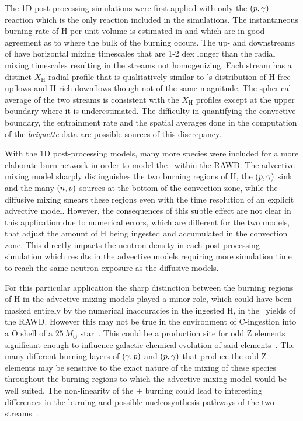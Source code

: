 \documentclass[fleqn,usenatbib]{mnras}
\newcommand{\ppmstar}{\code{PPMstar}}
\begin{document}
The 1D \mppnp{} post-processing simulations were first applied with only the
$(p,\gamma)$ reaction which is the only reaction
included in the \ppmstar{} simulations. The instantaneous burning rate of H per
unit volume is estimated in  and  which are in good
agreement as to where the bulk of the burning occurs.
The up- and downstreams of  have horizontal mixing timescales that
are 1-2 dex longer than the radial mixing timescales resulting in the streams
not homogenizing. Each stream has a distinct $X_{\mathrm{H}}$ radial profile
that is qualitatively similar to 's distribution of H-free upflows and
H-rich downflows though not of the same magnitude. The spherical average of the
two streams is consistent with the \ppmstar{} $X_{\mathrm{H}}$ profiles except
at the upper boundary where it is underestimated. The difficulty in quantifying
the convective boundary, the entrainment rate and the spatial averages done in
the computation of the \textit{briquette} data are possible sources of this
discrepancy.

With the 1D post-processing models, many more species were included for a more
elaborate burn network in order to model the \ipr~within the RAWD. The advective
mixing model sharply distinguishes the two burning regions of H, the
$(p,\gamma)$ sink and the many $(n, p)$
sources at the bottom of the convection zone, while the diffusive mixing smears
these regions even with the time resolution of an explicit advective model.
However, the consequences of this subtle effect are not clear in this
application due to numerical errors, which are different for the two models,
that adjust the amount of H being ingested and accumulated in the convection
zone. This directly impacts the neutron density in each post-processing
simulation which results in the advective models requiring more simulation time
to reach the same neutron exposure as the diffusive models.

For this particular application the sharp distinction between the burning
regions of H in the advective mixing models played a minor role, which could
have been masked entirely by the numerical inaccuracies in the ingested H, in
the \ipr~yields of the RAWD. However this may not be true in the environment of
C-ingestion into a O shell of a $25\,M_{\odot}$ star~\citep{Ritter2018}. This
could be a production site for odd Z elements significant enough to influence
galactic chemical evolution of said elements~\citep{Cote2018}. The many
different burning layers of $(\gamma, p)$ and $(p, \gamma)$ that produce the
odd Z elements may be sensitive to the exact nature of the mixing of these
species throughout the burning regions to which the advective mixing model would
be well suited. The non-linearity of the $+$ burning
could lead to interesting differences in the burning and possible
nucleosynthesis pathways of the two streams~\citep{Andrassy:19}.
\end{document}
